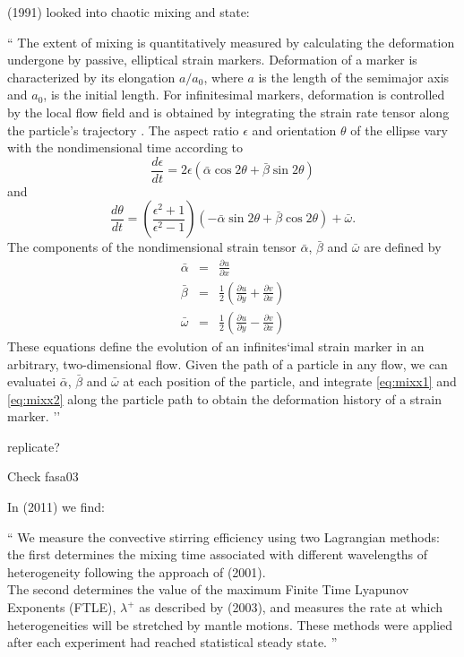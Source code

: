 \textcite{kest91} (1991) looked into chaotic mixing and state:
\begin{displayquote}
{\color{darkgray}
``
The extent of mixing is quantitatively measured by 
calculating the deformation undergone by passive, elliptical
strain markers. Deformation of a marker is characterized by
its elongation $a/a_0$, where $a$ is the length of the semimajor
axis and $a_0$, is the initial length. For infinitesimal markers,
deformation is controlled by the local flow field and is 
obtained by integrating the strain rate tensor along the particle's 
trajectory \cite{ketu90}. The aspect ratio $\epsilon$ and orientation $\theta$ 
of the ellipse vary with the nondimensional time according to
\begin{equation}
\frac{d\epsilon}{dt}=2 \epsilon (\bar{\alpha} \cos 2\theta + \bar{\beta} \sin 2\theta)
\label{eq:mixx1}
\end{equation}
and
\begin{equation}
\frac{d\theta}{dt}=\left(\frac{\epsilon^2 +1}{\epsilon^2-1} \right)
(-\bar{\alpha} \sin 2\theta + \bar{\beta} \cos 2\theta) + \bar{\omega}.
\label{eq:mixx2}
\end{equation}
The components of the nondimensional strain tensor $\bar{\alpha}$,
$\bar{\beta}$ and $\bar{\omega}$ are defined by
\begin{eqnarray}
\bar{\alpha} &=& \frac{\partial u}{\partial x} \\
\bar{\beta}  &=& \frac12\left( \frac{\partial u}{\partial y}+\frac{\partial v}{\partial x}\right)\\
\bar{\omega} &=& \frac12\left( \frac{\partial u}{\partial y}-\frac{\partial v}{\partial x}\right)
\end{eqnarray}
These equations define the evolution of an infinites`imal
strain marker in an arbitrary, two-dimensional flow. Given
the path of a particle in any flow, we can evaluatei
$\bar{\alpha}$, $\bar{\beta}$ and $\bar{\omega}$
at each position of the particle, and integrate \eqref{eq:mixx1} and \eqref{eq:mixx2}
along the particle path to obtain the deformation history of a
strain marker.
''
}
\end{displayquote}
{\color{orange} replicate?}


Check fasa03

In \textcite{saad11} (2011) we find:
\begin{displayquote}
{\color{darkgray}
``
We measure the convective stirring efficiency using
two Lagrangian methods: \\
the first determines the mixing
time associated with different wavelengths of heterogeneity
following the approach of \textcite{feri01} (2001).\\
The second determines the value of the maximum Finite Time
Lyapunov Exponents (FTLE), $\lambda^+$ as described by 
\textcite{fasa03} (2003), and measures the rate at which 
heterogeneities will be stretched by mantle motions. These methods
were applied after each experiment had reached statistical
steady state.
''
}
\end{displayquote}



